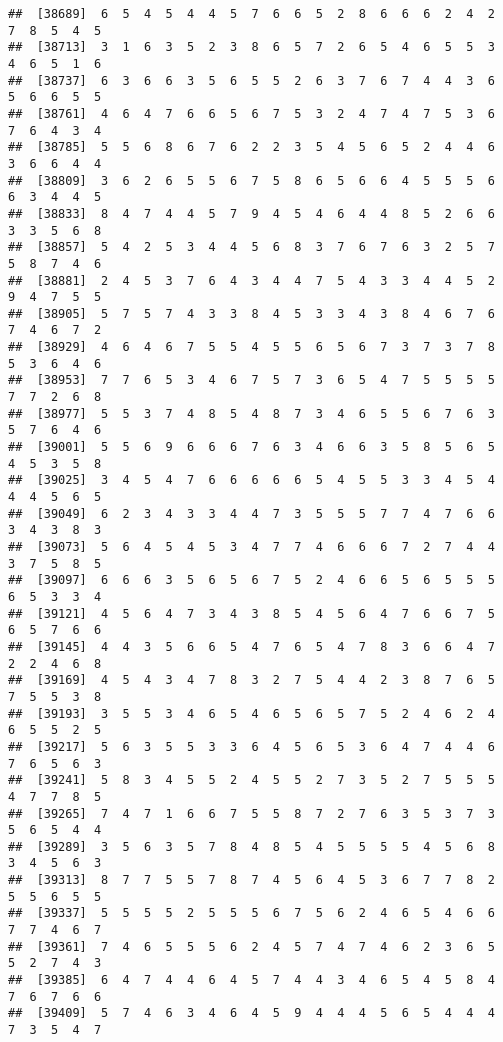 \documentclass[
]{book}
\begin{document}
\begin{verbatim}
##  [38689]  6  5  4  5  4  4  5  7  6  6  5  2  8  6  6  6  2  4  2  7  8  5  4  5
##  [38713]  3  1  6  3  5  2  3  8  6  5  7  2  6  5  4  6  5  5  3  4  6  5  1  6
##  [38737]  6  3  6  6  3  5  6  5  5  2  6  3  7  6  7  4  4  3  6  5  6  6  5  5
##  [38761]  4  6  4  7  6  6  5  6  7  5  3  2  4  7  4  7  5  3  6  7  6  4  3  4
##  [38785]  5  5  6  8  6  7  6  2  2  3  5  4  5  6  5  2  4  4  6  3  6  6  4  4
##  [38809]  3  6  2  6  5  5  6  7  5  8  6  5  6  6  4  5  5  5  6  6  3  4  4  5
##  [38833]  8  4  7  4  4  5  7  9  4  5  4  6  4  4  8  5  2  6  6  3  3  5  6  8
##  [38857]  5  4  2  5  3  4  4  5  6  8  3  7  6  7  6  3  2  5  7  5  8  7  4  6
##  [38881]  2  4  5  3  7  6  4  3  4  4  7  5  4  3  3  4  4  5  2  9  4  7  5  5
##  [38905]  5  7  5  7  4  3  3  8  4  5  3  3  4  3  8  4  6  7  6  7  4  6  7  2
##  [38929]  4  6  4  6  7  5  5  4  5  5  6  5  6  7  3  7  3  7  8  5  3  6  4  6
##  [38953]  7  7  6  5  3  4  6  7  5  7  3  6  5  4  7  5  5  5  5  7  7  2  6  8
##  [38977]  5  5  3  7  4  8  5  4  8  7  3  4  6  5  5  6  7  6  3  5  7  6  4  6
##  [39001]  5  5  6  9  6  6  6  7  6  3  4  6  6  3  5  8  5  6  5  4  5  3  5  8
##  [39025]  3  4  5  4  7  6  6  6  6  6  5  4  5  5  3  3  4  5  4  4  4  5  6  5
##  [39049]  6  2  3  4  3  3  4  4  7  3  5  5  5  7  7  4  7  6  6  3  4  3  8  3
##  [39073]  5  6  4  5  4  5  3  4  7  7  4  6  6  6  7  2  7  4  4  3  7  5  8  5
##  [39097]  6  6  6  3  5  6  5  6  7  5  2  4  6  6  5  6  5  5  5  6  5  3  3  4
##  [39121]  4  5  6  4  7  3  4  3  8  5  4  5  6  4  7  6  6  7  5  6  5  7  6  6
##  [39145]  4  4  3  5  6  6  5  4  7  6  5  4  7  8  3  6  6  4  7  2  2  4  6  8
##  [39169]  4  5  4  3  4  7  8  3  2  7  5  4  4  2  3  8  7  6  5  7  5  5  3  8
##  [39193]  3  5  5  3  4  6  5  4  6  5  6  5  7  5  2  4  6  2  4  6  5  5  2  5
##  [39217]  5  6  3  5  5  3  3  6  4  5  6  5  3  6  4  7  4  4  6  7  6  5  6  3
##  [39241]  5  8  3  4  5  5  2  4  5  5  2  7  3  5  2  7  5  5  5  4  7  7  8  5
##  [39265]  7  4  7  1  6  6  7  5  5  8  7  2  7  6  3  5  3  7  3  5  6  5  4  4
##  [39289]  3  5  6  3  5  7  8  4  8  5  4  5  5  5  5  4  5  6  8  3  4  5  6  3
##  [39313]  8  7  7  5  5  7  8  7  4  5  6  4  5  3  6  7  7  8  2  5  5  6  5  5
##  [39337]  5  5  5  5  2  5  5  5  6  7  5  6  2  4  6  5  4  6  6  7  7  4  6  7
##  [39361]  7  4  6  5  5  5  6  2  4  5  7  4  7  4  6  2  3  6  5  5  2  7  4  3
##  [39385]  6  4  7  4  4  6  4  5  7  4  4  3  4  6  5  4  5  8  4  7  6  7  6  6
##  [39409]  5  7  4  6  3  4  6  4  5  9  4  4  4  5  6  5  4  4  4  7  3  5  4  7

\end{verbatim}
\end{document}
